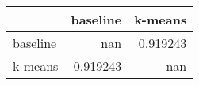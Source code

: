 \begin{tabular}{lrr}
\toprule
          &   baseline &    k-means \\
\midrule
 baseline & nan        &   0.919243 \\
 k-means  &   0.919243 & nan        \\
\bottomrule
\end{tabular}